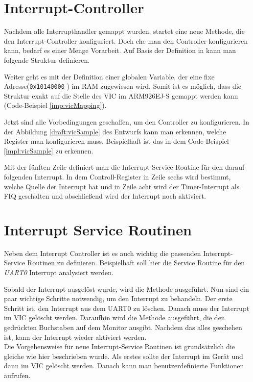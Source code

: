 \section{Interrupt-Controller}
Nachdem alle Interrupthandler gemappt wurden, startet eine neue Methode, die den Interrupt-Controller konfiguriert. Doch ehe man den Controller konfigurieren kann, bedarf es einer Menge Vorarbeit. Auf Basis der Definition in \cite[35]{vic} kann man folgende Struktur definieren.

Weiter geht es mit der Definition einer globalen Variable, der eine fixe Adresse(\texttt{0x10140000} \parencite[vgl. Tabelle 4-37][223]{archManI}) im RAM zugewiesen wird. Somit ist es m\"oglich, dass die Struktur exakt auf die Stelle des VIC im ARM926EJ-S gemappt werden kann (Code-Beispiel \ref{imp:vicMapping}). 

Jetzt sind alle Vorbedingungen geschaffen, um den Controller zu konfigurieren. In der Abbildung \ref{draft:vicSample} des Entwurfs kann man erkennen, welche Register man konfigurieren muss. Beispielhaft ist das in dem Code-Beispiel  \ref{impl:vicSample} zu erkennen.

Mit der f\"unften Zeile definiert man die Interrupt-Service Routine f\"ur den darauf folgenden Interrupt. In dem Controll-Register in Zeile sechs wird bestimmt, welche Quelle der Interrupt hat und in Zeile acht wird der Timer-Interrupt als FIQ geschalten und abschlie\ss end wird der Interrupt noch aktiviert.
\section{Interrupt Service Routinen}
Neben dem Interrupt Controller ist es auch wichtig die passenden Interrupt-Service Routinen zu definieren. Beispielhaft soll hier die Service Routine f\"ur den \textit{UART0} Interrupt analysiert werden. 

Sobald der Interrupt ausgel\"ost wurde, wird die Methode ausgef\"uhrt. Nun sind ein paar wichtige Schritte notwendig, um den Interrupt zu behandeln. Der erste Schritt ist, den Interrupt aus dem UART0 zu l\"oschen. Danach muss der Interrupt im VIC gel\"oscht werden. Daraufhin wird die Methode ausgef\"uhrt, die den gedr\"uckten Buchstaben auf dem Monitor ausgibt.
Nachdem das alles geschehen ist, kann der Interrupt wieder aktiviert werden.\\
Die Vorgehensweise f\"ur neue Interrupt-Service Routinen ist grunds\"atzlich die gleiche wie hier beschrieben wurde. Als erstes sollte der Interrupt im Ger\"at und dann im VIC gel\"oscht werden. Danach kann man benutzerdefinierte Funktionen aufrufen.
